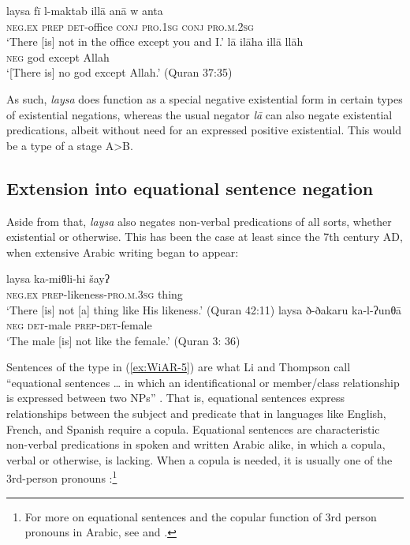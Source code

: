 \documentclass[output=paper]{langsci/langscibook}
\begin{document}
\ea \label{ex:WiAR-4}
  \ea
  	\gll laysa fī l-maktab illā anā w anta\\
  	\textsc{neg.ex} \textsc{prep} \textsc{det}-office \textsc{conj} \textsc{pro.1sg} \textsc{conj} \textsc{pro.m.2sg}\\
  	\glt ‘There [is] not in the office except you and I.’ \citep[273]{adwan2000a}
  \ex
  	\gll lā ilāha illā llāh\\
  	\textsc{neg} god except Allah\\
  	\glt ‘[There is] no god except Allah.’ (Quran 37:35)
\z \z

As such, \textit{laysa} does function as a special negative existential form in certain types of existential negations, whereas the usual negator \textit{lā} can also negate existential predications, albeit without need for an expressed positive existential. This would be a type of a stage A>B.

\subsection{Extension into equational sentence negation} \label{s:WiAR-2.2}

Aside from that, \textit{laysa} also negates non-verbal predications of all sorts, whether existential or otherwise. This has been the case at least since the 7th century AD, when extensive Arabic writing began to appear:

\ea \label{ex:WiAR-5}
  \ea
  	\gll laysa ka-miθli-hi šayʔ\\
  	\textsc{neg.ex} \textsc{prep}-likeness-\textsc{pro.m.3sg} thing\\
  	\glt ‘There [is] not [a] thing like His likeness.’ (Quran 42:11)
  \ex
  	\gll laysa ð-ðakaru ka-l-ʔunθā\\
  	\textsc{neg} \textsc{det}-male \textsc{prep-det}-female\\
  	\glt ‘The male [is] not like the female.’ (Quran 3: 36)
\z \z


Sentences of the type in (\ref{ex:WiAR-5}) are what Li and Thompson call “equational sentences … in which an identificational or member/class relationship is expressed between two NPs” \citeyearpar[419]{li1977a}. That is, equational sentences express relationships between the subject and predicate that in languages like English, French, and Spanish require a copula. Equational sentences are characteristic non-verbal predications in spoken and written Arabic alike, in which a copula, verbal or otherwise, is lacking. When a copula is needed, it is usually one of the 3rd-person pronouns \citep[431-433]{li1977a}:\footnote{For more on equational sentences and the copular function of 3rd person pronouns in Arabic, see \citet{eid1983a, eid1991a} and \citet{choueiri2016a}.}
\end{document}
